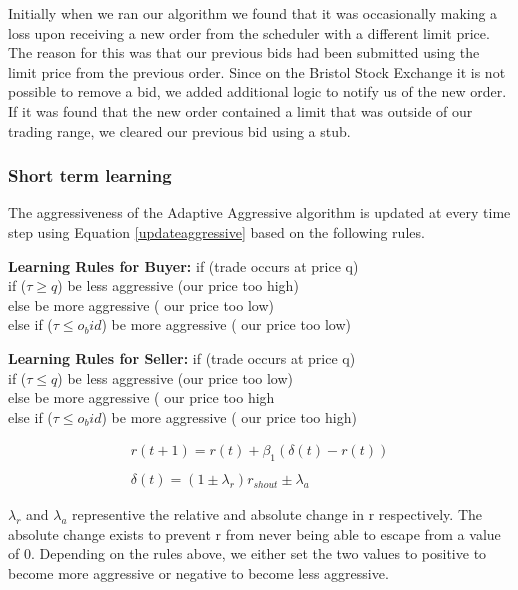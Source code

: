 \documentclass{acm_proc_article-sp}
\begin{document}
Initially when we ran our algorithm we found that it was occasionally making a
loss upon receiving a new order from the scheduler with a different limit
price. The reason for this was that our previous bids had been submitted using
the limit price from the previous order. Since on the Bristol Stock Exchange it
is not possible to remove a bid, we added additional logic to notify us of the
new order. If it was found that the new order contained a limit that was
outside of our trading range, we cleared our previous bid using a stub.\\


\subsubsection{Short term learning} \label{sec:AA_short_term_learning}
The aggressiveness of the Adaptive Aggressive algorithm is updated at every
time step using Equation \ref{updateaggressive} based on the following rules.

\textbf{Learning Rules for Buyer:}
if (trade occurs at price q)\\
    \indent if ($\tau \geq q$) be less aggressive (our price too high)\\
    \indent else be more aggressive ( our price too low)\\
else if ($\tau \leq o_bid$) be more aggressive ( our price too low)

\textbf{Learning Rules for Seller:}
if (trade occurs at price q)\\
    \indent if ($\tau \leq q$) be less aggressive (our price too low)\\
    \indent else be more aggressive ( our price too high\\
else if ($\tau \leq o_bid$) be more aggressive ( our price too high)

\begin{equation}
\label{updateaggressive}
\begin{split}
r(t+1) = r(t) + \beta_1(\delta(t) - r(t))\\\\
\delta(t) = (1 \pm \lambda_r)r_{shout} \pm \lambda_a
\end{split}
\end{equation}

$\lambda_r$ and $\lambda_a$ representive the relative and absolute change in
r respectively. The absolute change exists to prevent r from never being able
to escape from a value of 0. Depending on the rules above, we either set the
two values to positive to become more aggressive or negative to become less
aggressive.\\
\end{document}
